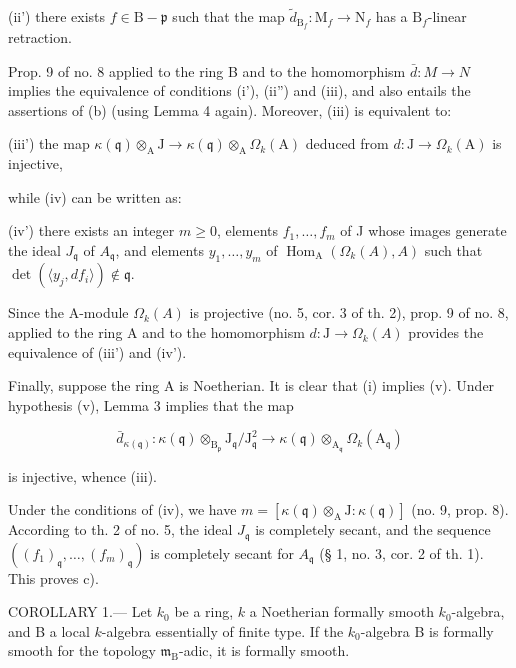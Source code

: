 (ii') there exists \(f \in \mathrm{B} - \mathfrak{p}\) such that the map \(\tilde{d}_{\mathrm{B}_f}: \mathrm{M}_f \to \mathrm{N}_f\) has a \(\mathrm{B}_f\)-linear retraction.

Prop. 9 of no. 8 applied to the ring B and to the homomorphism \(\bar{d}:M\to N\) implies the equivalence of conditions (i'), (ii'') and (iii), and also entails the assertions of (b) (using Lemma 4 again). Moreover, (iii) is equivalent to:

(iii') the map \(\kappa(\mathfrak{q})\otimes_{\mathrm{A}}\mathrm{J}\longrightarrow\kappa(\mathfrak{q})\otimes_{\mathrm{A}}\Omega_{k}(\mathrm{A})\) deduced from \(d:\mathrm{J}\to\Omega_{k}(\mathrm{A})\) is injective,

while (iv) can be written as:

(iv') there exists an integer \(m\geqslant 0\), elements \(f_{1},\ldots,f_{m}\) of J whose images generate the ideal \(J_{\mathfrak{q}}\) of \(A_{\mathfrak{q}}\), and elements \(y_{1},\ldots,y_{m}\) of \(\operatorname{Hom}_{\mathrm{A}}(\Omega_{k}(A),A)\) such that \(\det(\langle y_{j},df_{i}\rangle)\notin\mathfrak{q}\).

Since the \(\mathrm{A}\)-module \(\Omega_{k}(A)\) is projective (no. 5, cor. 3 of th. 2), prop. 9 of no. 8, applied to the ring A and to the homomorphism \(d:\mathrm{J}\to\Omega_{k}(A)\) provides the equivalence of (iii') and (iv').

Finally, suppose the ring A is Noetherian. It is clear that (i) implies (v). Under hypothesis (v), Lemma 3 implies that the map

\[
\bar {d} _ {\kappa (\mathfrak {q})}: \kappa (\mathfrak {q}) \otimes_ {\mathrm{B} _ {\mathfrak {p}}} \mathrm{J} _ {\mathfrak {q}} / \mathrm{J} _ {\mathfrak {q}} ^ {2} \longrightarrow \kappa (\mathfrak {q}) \otimes_ {\mathrm{A} _ {\mathfrak {q}}} \Omega_ {k} (\mathrm{A} _ {\mathfrak {q}})
\]

is injective, whence (iii).

Under the conditions of (iv), we have \(m=[\kappa(\mathfrak{q})\otimes_{\mathrm{A}}\mathrm{J}:\kappa(\mathfrak{q})]\) (no. 9, prop. 8). According to th. 2 of no. 5, the ideal \(J_{\mathfrak{q}}\) is completely secant, and the sequence \(((f_1)_{\mathfrak{q}},\ldots,(f_m)_{\mathfrak{q}})\) is completely secant for \(A_{\mathfrak{q}}\) (§ 1, no. 3, cor. 2 of th. 1). This proves c).

COROLLARY 1.--- Let \(k_{0}\) be a ring, \(k\) a Noetherian formally smooth \(k_{0}\)-algebra, and B a local \(k\)-algebra essentially of finite type. If the \(k_{0}\)-algebra B is formally smooth for the topology \(\mathfrak{m}_{\mathrm{B}}\)-adic, it is formally smooth.

